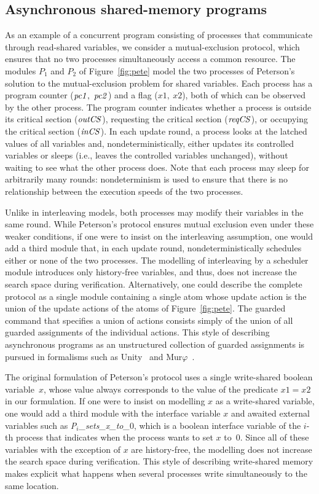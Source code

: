 \subsection{Asynchronous shared-memory programs}

As an example of a concurrent program consisting of processes that
communicate through read-shared variables, we consider a mutual-exclusion
protocol, which ensures that no two processes simultaneously access a common
resource.
The modules $P_1$ and $P_2$ of Figure~\ref{fig:pete} model the two processes
of Peterson's solution to the mutual-exclusion problem for shared variables.
Each process  has a program counter (${\it pc1\/},~{\it pc2\/}$) and a flag ($x1,~x2$), both
of which can be observed by the other process.
The program counter indicates whether a process is outside its critical
section (${\it outCS\/}$), requesting the critical section
(${\it reqCS\/}$), or occupying the critical section (${\it inCS\/}$).
In each update round, a process looks at the latched values of all variables
and, nondeterministically, either updates its controlled variables or sleeps
(i.e., leaves the controlled variables unchanged), without waiting to see
what the other process does.
Note that each process may sleep for arbitrarily many rounds:
nondeterminism is used to ensure that there is no relationship between the
execution speeds of the two processes.

 Unlike in interleaving models, both
processes may modify their variables in the same round. While
Peterson's protocol ensures mutual exclusion even under these
weaker conditions, if one were to insist on the interleaving
assumption, one would add a third module that, in each update
round, nondeterministically schedules either or none of the two
processes. The modelling of interleaving by a scheduler module
introduces only history-free variables, and thus, does not
increase the search space during verification. Alternatively, one
could describe the complete protocol as a single module containing
a single atom whose update action is the union of the update
actions of the atoms of Figure~\ref{fig:pete}. The guarded command
that specifies a union of actions consists simply of the union of
all guarded assignments of the individual actions. This style of
describing asynchronous programs as an unstructured collection of
guarded assignments is pursued in formalisms such as {\sc
Unity}~\cite{ChandyMisra88} and {\sc Mur}$\varphi$~\cite{}.

 The original formulation of
Peterson's protocol uses a single write-shared boolean
variable~$x$, whose value always corresponds to the value of the
predicate $x1=x2$ in our formulation. If one were to insist on
modelling $x$ as a write-shared variable, one would add a third
module with the interface variable $x$ and awaited external
variables such as {\em P$_i$\_sets\_x\_to\_}0, which is a boolean
interface variable of the $i$-th process that indicates when the
process wants to set $x$ to~0. Since all of these variables with
the exception of $x$ are history-free, the modelling does not
increase the search space during verification. This style of
describing write-shared memory makes explicit what happens when
several processes write simultaneously to the same location.


